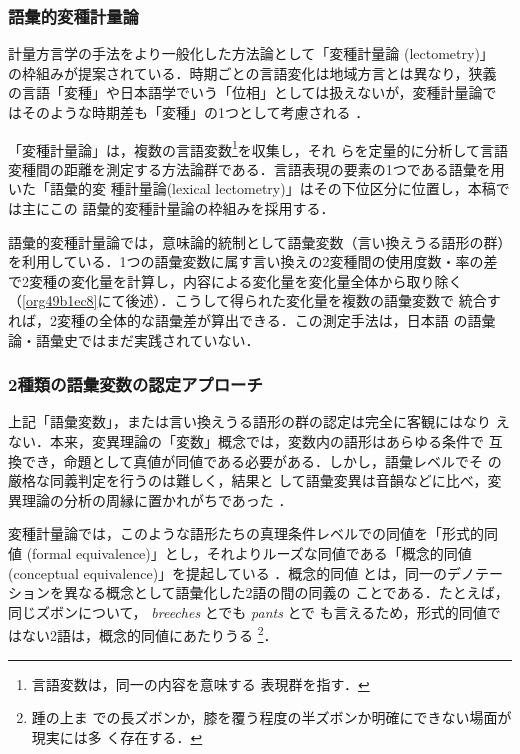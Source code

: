\documentclass[submit]{ipsj}
\renewcommand{\ref}{\cref}
\begin{document}
\subsubsection{語彙的変種計量論\label{org880f183}}
\label{sec:org67eb760}
計量方言学の手法をより一般化した方法論として「変種計量論 (lectometry)」
の枠組みが提案されている．時期ごとの言語変化は地域方言とは異なり，狭義
の言語「変種」や日本語学でいう「位相」としては扱えないが，変種計量論で
はそのような時期差も「変種」の1つとして考慮される
\cite{Geeraerts2023Lexical}．

「変種計量論」は，複数の言語変数\footnote{言語変数は，同一の内容を意味する
表現群を指す\cite[, 188]{Labov1972Sociolinguistic}．}を収集し，それ
らを定量的に分析して言語変種間の距離を測定する方法論群である\cite{Ruette2014Semantic}．言語表現の要素の1つである語彙を用いた「語彙的変
種計量論(lexical lectometry)」はその下位区分に位置し，本稿では主にこの
語彙的変種計量論の枠組みを採用する．

語彙的変種計量論では，意味論的統制として語彙変数（言い換えうる語形の群）
を利用している．1つの語彙変数に属す言い換えの2変種間の使用度数・率の差
で2変種の変化量を計算し，内容による変化量を変化量全体から取り除く
（\ref{org49b1ec8}にて後述）．こうして得られた変化量を複数の語彙変数で
統合すれば，2変種の全体的な語彙差が算出できる．この測定手法は，日本語
の語彙論・語彙史ではまだ実践されていない．
\subsubsection{2種類の語彙変数の認定アプローチ}
\label{sec:org0a34011}
上記「語彙変数」，または言い換えうる語形の群の認定は完全に客観にはなり
えない．本来，変異理論の「変数」概念では，変数内の語形はあらゆる条件で
互換でき，命題として真値が同値である必要がある．しかし，語彙レベルでそ
の厳格な同義判定を行うのは難しく\cite{Lavandera1978Where}，結果と
して語彙変異は音韻などに比べ，変異理論の分析の周縁に置かれがちであった
\cite{DePascale2019Tokenbased}．

変種計量論では，このような語形たちの真理条件レベルでの同値を「形式的同
値 (formal equivalence)」とし，それよりルーズな同値である「概念的同値
(conceptual equivalence)」を提起している
\cite{Geeraerts2023Lexical,DePascale2019Tokenbased}．概念的同値
とは，同一のデノテーションを異なる概念として語彙化した2語の間の同義の
ことである．たとえば，同じズボンについて， \emph{breeches} とでも \emph{pants} とで
も言えるため，形式的同値ではない2語は，概念的同値にあたりうる
\cite{DePascale2019Tokenbased,Geeraerts2023Lexical}\footnote{踵の上ま
での長ズボンか，膝を覆う程度の半ズボンか明確にできない場面が現実には多
く存在する．}．
\end{document}
